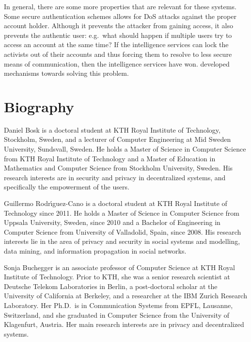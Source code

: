 \documentclass[a4paper]{llncs}
\begin{document}
In general, there are some more properties that are relevant for these systems.
Some secure authentication schemes allows for \ac{DoS} attacks against the 
proper account holder.
Although it prevents the attacker from gaining access, it also prevents the 
authentic user:
e.g.\ what should happen if multiple users try to access an account at the same 
time?
If the intelligence services can lock the activists out of their accounts and 
thus forcing them to resolve to less secure means of communication, then the 
intelligence services have won.
\citet{P2PPasswords} developed mechanisms towards solving this problem.


\printbibliography{}


\appendix
\section{Biography}
\label{Biography}

Daniel Bosk is a doctoral student at KTH Royal Institute of Technology, 
Stockholm, Sweden, and a lecturer of Computer Engineering at Mid Sweden 
University, Sundsvall, Sweden.
He holds a Master of Science in Computer Science from KTH Royal Institute of 
Technology and a Master of Education in Mathematics and Computer Science from 
Stockholm University, Sweden.
His research interests are in security and privacy in decentralized systems, 
and specifically the empowerment of the users.

Guillermo Rodr\'{\i}guez-Cano is a doctoral student at KTH Royal Institute of 
Technology since 2011.
He holds a Master of Science in Computer Science from Uppsala University, 
Sweden, since 2010 and a Bachelor of Engineering in Computer Science from 
University of Valladolid, Spain, since 2008.
His research interests lie in the area of privacy and security in social 
systems and modelling, data mining, and information propagation in social 
networks.

Sonja Buchegger is an associate professor of Computer Science at KTH Royal 
Institute of Technology.
Prior to KTH, she was a
senior research scientist at Deutsche Telekom Laboratories in Berlin,
a post-doctoral scholar at the University of California at Berkeley,
and a researcher at the IBM Zurich Research Laboratory.
Her Ph.D.\ is in Communication Systems from EPFL, Lausanne, Switzerland, and 
she graduated in Computer Science from the University of Klagenfurt, Austria.
Her main research interests are in privacy and decentralized systems.
\end{document}
